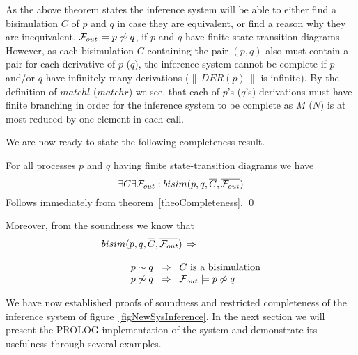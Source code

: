 As the above theorem states the inference system will be able to either find a bisimulation $C$ of $p$ and $q$ in case they are equivalent, or find a reason why they are inequivalent, ${\cal F}_{out}\models p\not\sim q$, if $p$ and $q$ have finite state-transition diagrams. However, as each bisimulation $C$ containing the pair $(p,q)$ also must contain a pair for each derivative of $p$ ($q$), the inference system cannot be complete if $p$ and/or $q$ have infinitely many derivations ($\|\,DER(p)\,\|$ is infinite). By the definition of $matchl$ ($matchr$) we see, that each of $p$'s ($q$'s) derivations must have finite branching in order for the inference system to be complete as $M$ ($N$) is at most reduced by one element in each call.

We are now ready to state the following completeness result.
\begin{corollary}[Completeness]
For all processes $p$ and $q$ having finite state-transition diagrams we have
\[
\exists C\exists{\cal F}_{out}:bisim(p,q,\overline{C},\overline{{\cal F}_{out}})
\]
\proof
Follows immediately from theorem~\ref{theoCompleteness}.
\qed
\end{corollary}

\noindent
Moreover, from the soundness we know that
\[
\begin{array}{llll}
\multicolumn{4}{l}{bisim(p,q,\overline{C},\overline{{\cal F}_{out}})\,\Rightarrow}\\
\\
&&& p\sim q\;\;\Rightarrow\;\;C \mbox{ is a bisimulation}\\
&&& p\not\sim q\;\;\Rightarrow\;\;{\cal F}_{out}\models p\not\sim q
\end{array}
\]

We have now established proofs of soundness and restricted completeness of the inference system of figure~\ref{figNewSysInference}. In the next section we will present the PROLOG-implementation of the system and demonstrate its usefulness through several examples.

